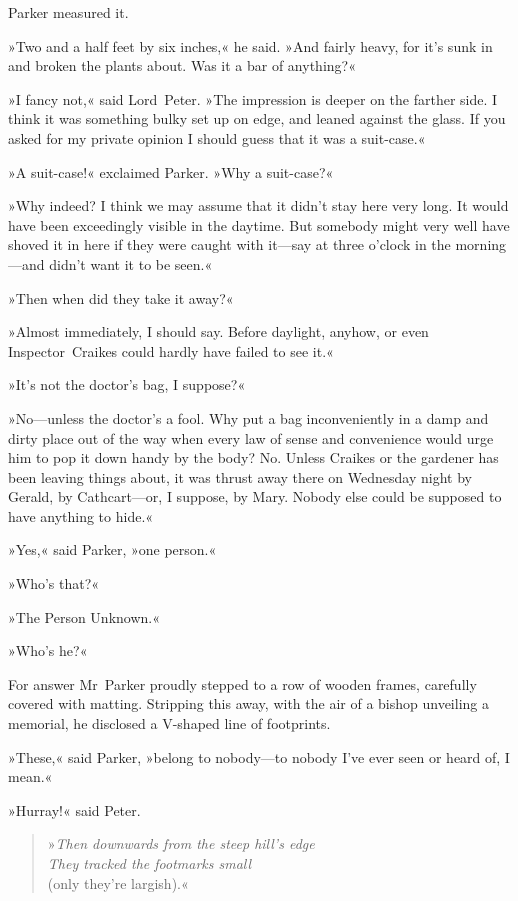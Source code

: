 Parker measured it.

»Two and a half feet by six inches,« he said. »And fairly heavy, for it's sunk in and broken the plants about. Was it a bar of anything?«

»I fancy not,« said Lord~Peter. »The impression is deeper on the farther side. I think it was something bulky set up on edge, and leaned against the glass. If you asked for my private opinion I should guess that it was a suit-case.«

»A suit-case!« exclaimed Parker. »Why a suit-case?«

»Why indeed? I think we may assume that it didn't stay here very long. It would have been exceedingly visible in the daytime. But somebody might very well have shoved it in here if they were caught with it—say at three o'clock in the morning—and didn't want it to be seen.«

»Then when did they take it away?«

»Almost immediately, I should say. Before daylight, anyhow, or even Inspector~Craikes could hardly have failed to see it.«

»It's not the doctor's bag, I suppose?«

»No—unless the doctor's a fool. Why put a bag inconveniently in a damp and dirty place out of the way when every law of sense and convenience would urge him to pop it down handy by the body? No. Unless Craikes or the gardener has been leaving things about, it was thrust away there on Wednesday night by Gerald, by Cathcart—or, I suppose, by Mary. Nobody else could be supposed to have anything to hide.«

»Yes,« said Parker, »one person.«

»Who's that?«

»The Person Unknown.«

»Who's he?«

For answer Mr~Parker proudly stepped to a row of wooden frames, carefully covered with matting. Stripping this away, with the air of a bishop unveiling a memorial, he disclosed a V-shaped line of footprints.

»These,« said Parker, »belong to nobody—to nobody I've ever seen or heard of, I mean.«

\begin{letter}
	\enlargethispage{\baselineskip}
\end{letter}

»Hurray!« said Peter.

\begin{quote}
\vspace{-2ex}
»\textit{Then downwards from the steep hill's edge\\They tracked the footmarks small}\\(only they're largish).«
\end{quote}
\vspace{-2ex}

